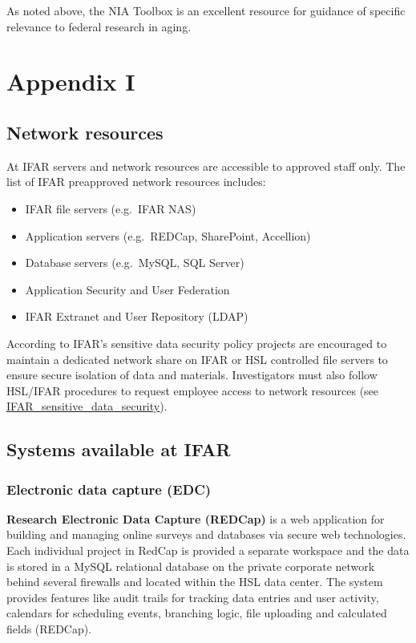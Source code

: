 \documentclass[]{book}
\providecommand{\tightlist}{%
  \setlength{\itemsep}{0pt}\setlength{\parskip}{0pt}}
\theoremstyle{definition}
\theoremstyle{definition}
\theoremstyle{definition}
\theoremstyle{remark}
\begin{document}
As noted above, the NIA Toolbox is an excellent resource for guidance of
specific relevance to federal research in aging.

\section{Appendix I}\label{appendix-i}

\subsection{Network resources}\label{network-resources}

At IFAR servers and network resources are accessible to approved staff
only. The list of IFAR preapproved network resources includes:

\begin{itemize}
\tightlist
\item
  IFAR file servers (e.g.~IFAR NAS)
\item
  Application servers (e.g.~REDCap, SharePoint, Accellion)
\item
  Database servers (e.g.~MySQL, SQL Server)
\item
  Application Security and User Federation
\item
  IFAR Extranet and User Repository (LDAP)
\end{itemize}

According to IFAR's sensitive data security policy projects are
encouraged to maintain a dedicated network share on IFAR or HSL
controlled file servers to ensure secure isolation of data and
materials. Investigators must also follow HSL/IFAR procedures to request
employee access to network resources (see
\href{http://thehslhub/~/media/HSLNet/P_P/IFAR/IFARPPSensitiveDataSecurity.ashx}{IFAR\_sensitive\_data\_security}).

\subsection{Systems available at IFAR}\label{systems-available-at-ifar}

\subsubsection{Electronic data capture
(EDC)}\label{electronic-data-capture-edc}

\textbf{Research Electronic Data Capture (REDCap)} is a web application
for building and managing online surveys and databases via secure web
technologies. Each individual project in RedCap is provided a separate
workspace and the data is stored in a MySQL relational database on the
private corporate network behind several firewalls and located within
the HSL data center. The system provides features like audit trails for
tracking data entries and user activity, calendars for scheduling
events, branching logic, file uploading and calculated fields (REDCap).
\end{document}
